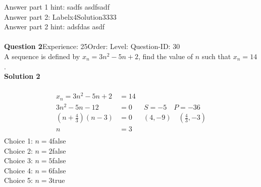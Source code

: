 \documentclass{article}
\begin{document}
Answer part 1 hint: \hspace{15pt}sadfs asdfsadf\\	
Answer part 2: \hspace{10pt}Label\hspace{10pt}x4\hspace{10pt}Solution\hspace{10pt}3333\\
Answer part 2 hint: \hspace{15pt}adsfdas asdf\\
\\[4pt]
\noindent\textbf{Question 2}\hspace{20pt}Experience: 25\hspace{20pt}Order: \hspace{20pt}Level: \hspace{20pt}Question-ID: 30\\[2pt]
A sequence is defined by $x_n=3n^2-5n+2$, find the value of $n$ such that $x_n=14$.\\[4pt]
\noindent\textbf{Solution 2}\\[2pt]
\\[-35pt]\begin{align*}
x_n=3n^2-5n+2&=14\\[2pt]
3n^2-5n-12&=0 \hspace{20pt} S=-5 \quad P=-36\\[2pt]
\left(n+\displaystyle\frac{4}{3}\right)(n-3)&=0 \hspace{19pt} (4,-9) \quad \left(\displaystyle\frac{4}{3},-3\right)\\[2pt]
n&=3\\
\end{align*}
Choice 1: \hspace{20pt}$n=4$\hspace{20pt}false\\
Choice 2: \hspace{20pt}$n=2$\hspace{20pt}false\\
Choice 3: \hspace{20pt}$n=5$\hspace{20pt}false\\
Choice 4: \hspace{20pt}$n=6$\hspace{20pt}false\\
Choice 5: \hspace{20pt}$n=3$\hspace{20pt}true\\
\\[4pt]
\end{document}
